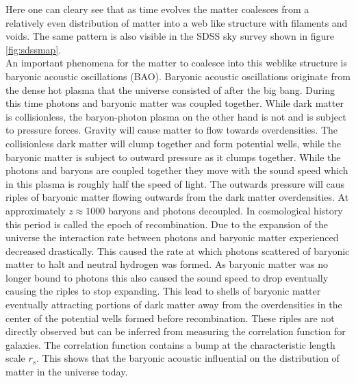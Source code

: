 Here one can cleary see that as time evolves the matter coalesces from a
relatively even distribution of matter into a web like structure with filaments
and voids. The same pattern is also visible in the SDSS sky survey shown in
figure \ref{fig:sdssmap}.\\\indent
An important phenomena for the matter to coalesce into this weblike structure is
baryonic acoustic oscillations (BAO). Baryonic acoustic oscillations originate
from the dense hot plasma that the universe consisted of after the big bang.
During this time photons and baryonic matter was coupled together. While dark
matter is collisionless, the baryon-photon plasma on the other hand is not and
is subject to pressure forces. Gravity will cause matter to flow towards
overdensities. The collisionless dark matter will clump together and form
potential wells, while the baryonic matter is subject to outward pressure as it clumps
together. While the photons and baryons are coupled together they move with the
sound speed which in this plasma is roughly half the speed of light. The
outwards pressure will caus riples of baryonic matter flowing outwards from the
dark matter overdensities. At approximately $z\approx 1000$ baryons and photons
decoupled. In cosmological history this period is called the epoch of
recombination. Due to the expansion of the universe the interaction rate between
photons and baryonic matter experienced decreased drastically. This caused the
rate at which photons scattered of baryonic matter to halt and neutral hydrogen was formed.
As baryonic matter was no longer bound to photons this also caused the sound
speed to drop eventually causing the riples to stop expanding. This lead to
shells of baryonic matter eventually attracting
portions of dark matter away from the overdensities in the center of the
potential wells formed before recombination. These riples are not directly
observed but can be inferred from measuring the correlation function for
galaxies. The correlation function contains a bump at the characteristic length
scale $r_s$. This shows that the baryonic acoustic influential on the distribution of
matter in the universe today.

